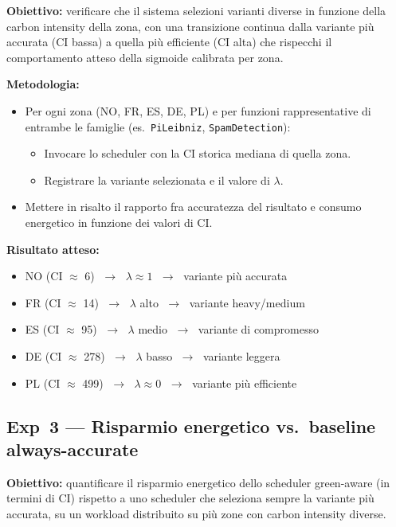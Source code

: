 \documentclass[a4paper,11pt]{article}
\begin{document}
\textbf{Obiettivo:} verificare che il sistema selezioni varianti diverse in funzione
della carbon intensity della zona, con una transizione continua dalla variante più
accurata (CI bassa) a quella più efficiente (CI alta) che rispecchi il comportamento
atteso della sigmoide calibrata per zona.

\medskip
\textbf{Metodologia:}
\begin{itemize}
  \item Per ogni zona (NO, FR, ES, DE, PL) e per funzioni rappresentative di entrambe
    le famiglie (es.\ \texttt{PiLeibniz}, \texttt{SpamDetection}):
    \begin{itemize}
      \item Invocare lo scheduler con la CI storica mediana di quella zona.
      \item Registrare la variante selezionata e il valore di $\lambda$.
    \end{itemize}
  \item Mettere in risalto il rapporto fra accuratezza del risultato e consumo
    energetico in funzione dei valori di CI.
\end{itemize}

\textbf{Risultato atteso:}
\begin{itemize}
  \item NO (CI $\approx$ 6) $\;\rightarrow\;$ $\lambda \approx 1$
    $\;\rightarrow\;$ variante più accurata
  \item FR (CI $\approx$ 14) $\;\rightarrow\;$ $\lambda$ alto
    $\;\rightarrow\;$ variante heavy/medium
  \item ES (CI $\approx$ 95) $\;\rightarrow\;$ $\lambda$ medio
    $\;\rightarrow\;$ variante di compromesso
  \item DE (CI $\approx$ 278) $\;\rightarrow\;$ $\lambda$ basso
    $\;\rightarrow\;$ variante leggera
  \item PL (CI $\approx$ 499) $\;\rightarrow\;$ $\lambda \approx 0$
    $\;\rightarrow\;$ variante più efficiente
\end{itemize}

\subsection{Exp~3 --- Risparmio energetico vs.\ baseline always-accurate}

\textbf{Obiettivo:} quantificare il risparmio energetico dello scheduler green-aware
(in termini di CI) rispetto a uno scheduler che seleziona sempre la variante più
accurata, su un workload distribuito su più zone con carbon intensity diverse.
\end{document}
